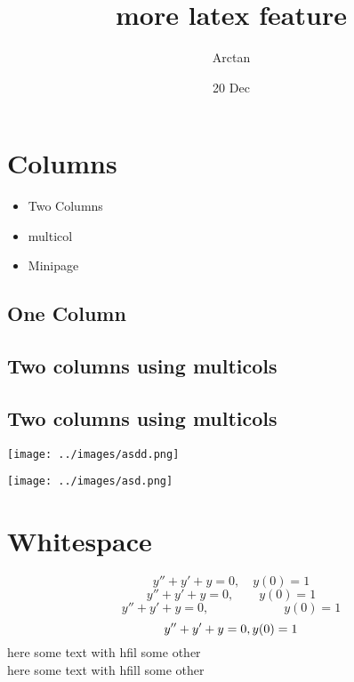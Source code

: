 \documentclass{article}
\title{more latex feature}
\author{Arctan}
\date{20 Dec}
\begin{document}
\maketitle

\section{Columns}
\begin{itemize}
    \item Two Columns
    \item multicol
    \item Minipage
\end{itemize}

\newpage
\onecolumn
\subsection{One Column}
\lipsum[1-2]

\newpage
\subsection{Two columns using multicols}
\begin{multicols}{2}
    \lipsum[1-3]
\end{multicols}

\newpage

\subsection{Two columns using multicols}
\begin{multicols*}{2}
    
    \lipsum[1-3]
\end{multicols*}

\newpage
\begin{minipage}{0.6\textwidth}
    \texttt{[image: ../images/asdd.png]}
\end{minipage}
\hspace{10pt}
\begin{minipage}{0.3\textwidth}
    \texttt{[image: ../images/asd.png]}
\end{minipage}

\newpage
\section{Whitespace}

\[y''+ y'+y=0,\quad y(0)=1\]
\[y'' + y'+y=0, \qquad y(0)=1 \]
\[y'' + y'+y=0, \hspace{1in} y(0)=1 \]
\[y'' + y'+y=0, \hfill y(0)=1 \]
here some text with hfil \hfil some other \\
here some text with hfill \hfill some other
\end{document}
